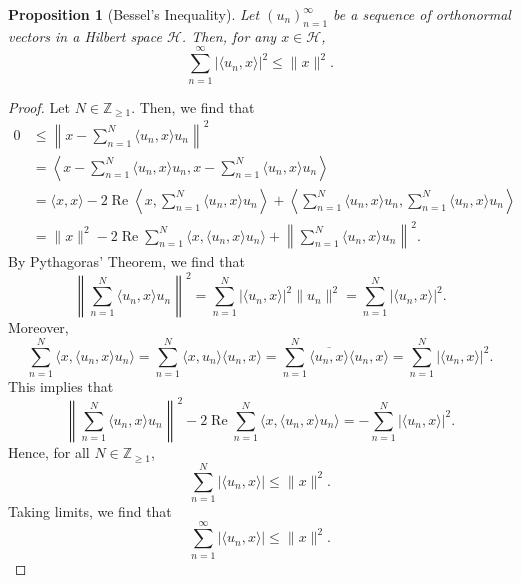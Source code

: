 \documentclass[a4paper, openany]{memoir}
\theoremstyle{definition}
\theoremstyle{plain}
\newtheorem{proposition}[definition]{Proposition}
\begin{document}
    \begin{proposition}[Bessel's Inequality]
        Let $(u_n)_{n=1}^\infty$ be a sequence of orthonormal vectors in a Hilbert space $\mathcal{H}$. Then, for any $x \in \mathcal{H}$,
        \[\sum_{n=1}^\infty |\langle u_n, x \rangle|^2 \leq \lVert x \rVert^2.\]
    \end{proposition}
    \begin{proof}
        Let $N \in \mathbb{Z}_{\geq 1}$. Then, we find that
        \begin{align*}
            0 &\leq \left \lVert x - \sum_{n=1}^N \langle u_n, x \rangle u_n \right \rVert^2 \\
            &= \left\langle x - \sum_{n=1}^N \langle u_n, x \rangle u_n, x - \sum_{n=1}^N \langle u_n, x \rangle u_n \right\rangle \\
            &= \langle x, x \rangle - 2\operatorname{Re} \left\langle  x, \sum_{n=1}^N \langle u_n, x \rangle u_n \right\rangle + \left\langle \sum_{n=1}^N \langle u_n, x \rangle u_n, \sum_{n=1}^N \langle u_n, x \rangle u_n \right\rangle \\
            &= \lVert x \rVert^2 - 2\operatorname{Re} \sum_{n=1}^N \langle x, \langle u_n, x \rangle u_n \rangle + \left\lVert \sum_{n=1}^N \langle u_n, x \rangle u_n \right\rVert^2.
        \end{align*}
        By Pythagoras' Theorem, we find that 
        \[\left\lVert \sum_{n=1}^N \langle u_n, x \rangle u_n \right\rVert^2 = \sum_{n=1}^N |\langle u_n, x \rangle|^2 \lVert u_n \rVert^2 = \sum_{n=1}^N |\langle u_n, x \rangle|^2.\]
        Moreover,
        \[\sum_{n=1}^N \langle x, \langle u_n, x \rangle u_n \rangle = \sum_{n=1}^N \langle x, u_n \rangle \langle u_n, x \rangle = \sum_{n=1}^N \overline{\langle u_n, x \rangle} \langle u_n, x \rangle = \sum_{n=1}^N |\langle u_n, x \rangle|^2.\]
        This implies that 
        \[\left\lVert \sum_{n=1}^N \langle u_n, x \rangle u_n \right\rVert^2 - 2\operatorname{Re} \sum_{n=1}^N \langle x, \langle u_n, x \rangle u_n \rangle = - \sum_{n=1}^N |\langle u_n, x \rangle|^2.\]
        Hence, for all $N \in \mathbb{Z}_{\geq 1}$,
        \[\sum_{n=1}^N |\langle u_n, x \rangle| \leq \lVert x \rVert^2 .\]
        Taking limits, we find that 
        \[\sum_{n=1}^\infty |\langle u_n, x \rangle| \leq \lVert x \rVert^2.\]
    \end{proof}
\end{document}
